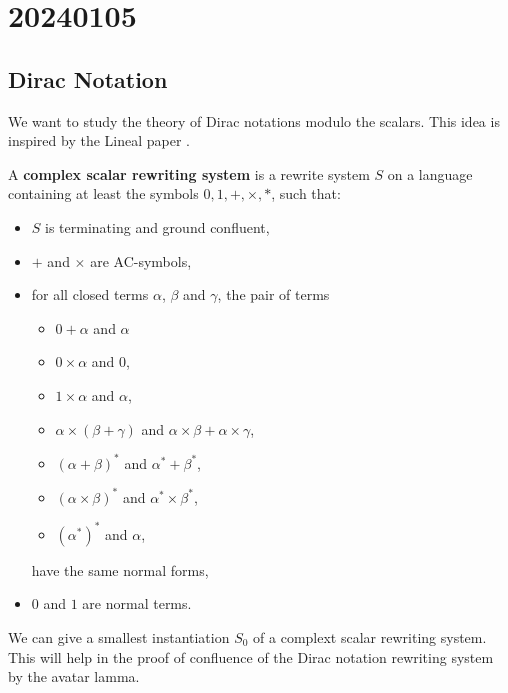 \chapter{20240105}

\renewcommand*{\unit}{\texttt{unit}}
\renewcommand*{\utt}{\texttt{tt}}
\renewcommand*{\fst}{\texttt{fst}}
\renewcommand*{\snd}{\texttt{snd}}
\renewcommand*{\reduce}{\ \triangleright\ }

\section{Dirac Notation}

We want to study the theory of Dirac notations modulo the scalars. This idea is inspired by the Lineal paper \cite{Arrighi2017}.

\begin{definition}
  A \textbf{complex scalar rewriting system} is a rewrite system $S$ on a language containing at least the symbols $0, 1, +, \times, *$, such that:
  \begin{itemize}
    \item $S$ is terminating and ground confluent,
    \item $+$ and $\times$ are AC-symbols,
    \item for all closed terms $\alpha$, $\beta$ and $\gamma$, the pair of terms
      \begin{itemize}
        \item $0 + \alpha$ and $\alpha$
        \item $0 \times \alpha$ and $0$,
        \item $1 \times \alpha$ and $\alpha$,
        \item $\alpha \times (\beta + \gamma)$ and $\alpha \times \beta + \alpha \times \gamma$,
        \item $(\alpha + \beta)^*$ and $\alpha^* + \beta^*$,
        \item $(\alpha \times \beta)^*$ and $\alpha^* \times \beta^*$,
        \item $(\alpha^*)^*$ and $\alpha$,
      \end{itemize}
      have the same normal forms,
    \item $0$ and $1$ are normal terms.
  \end{itemize}
\end{definition}

We can give a smallest instantiation $S_0$ of a complext scalar rewriting system. This will help in the proof of confluence of the Dirac notation rewriting system by the avatar lamma.

